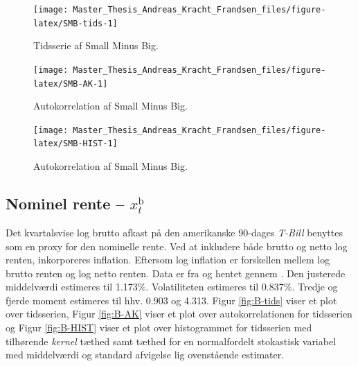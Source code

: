 \documentclass[
  a4paper,
  oneside]{memoir}
\begin{document}
\begin{figure}[htbp!]

{\centering \texttt{[image: Master\_Thesis\_Andreas\_Kracht\_Frandsen\_files/figure-latex/SMB-tids-1]} 

}

\caption{Tidsserie af Small Minus Big.}\label{fig:SMB-tids}
\end{figure}

\begin{figure}[htbp!]

{\centering \texttt{[image: Master\_Thesis\_Andreas\_Kracht\_Frandsen\_files/figure-latex/SMB-AK-1]} 

}

\caption{Autokorrelation af Small Minus Big.}\label{fig:SMB-AK}
\end{figure}

\begin{figure}[htbp!]

{\centering \texttt{[image: Master\_Thesis\_Andreas\_Kracht\_Frandsen\_files/figure-latex/SMB-HIST-1]} 

}

\caption{Autokorrelation af Small Minus Big.}\label{fig:SMB-HIST}
\end{figure}

\hypertarget{nominel-rente-x_ttextb}{%
\subsection{\texorpdfstring{Nominel rente -- \(x_t^{\text{b}}\)}{Nominel rente -- x\_t\^{}\{\textbackslash text\{b\}\}}}\label{nominel-rente-x_ttextb}}

Det kvartalsvise log brutto afkast på den amerikanske 90-dages \emph{T-Bill} benyttes som en proxy for den nominelle rente. Ved at inkludere både brutto og netto log renten, inkorporeres inflation. Eftersom log inflation er forskellen mellem log brutto renten og log netto renten. Data er fra \citep{CRSPt90} og hentet gennem \citep{WRDSt90}. Den justerede middelværdi estimeres til 1.173\(\%\). Volatiliteten estimeres til 0.837\(\%\). Tredje og fjerde moment estimeres til hhv. 0.903 og 4.313. Figur \ref{fig:B-tids} viser et plot over tidsserien, Figur \ref{fig:B-AK} viser et plot over autokorrelationen for tidsserien og Figur \ref{fig:B-HIST} viser et plot over histogrammet for tidsserien med tilhørende \emph{kernel} tæthed samt tæthed for en normalfordelt stokastisk variabel med middelværdi og standard afvigelse lig ovenstående estimater.
\end{document}

